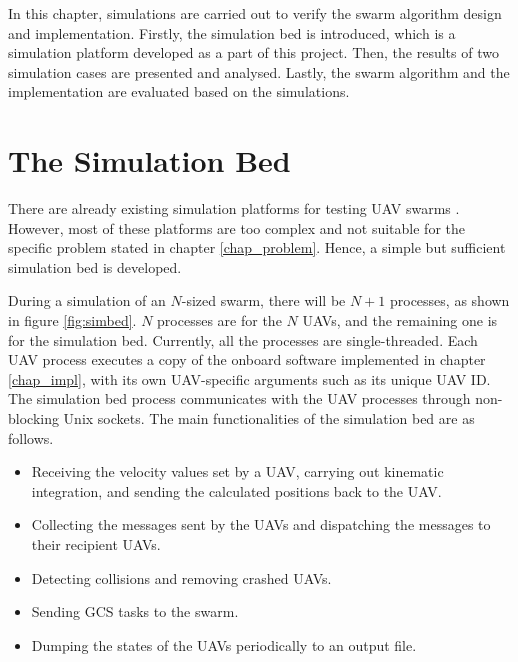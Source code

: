 In this chapter, simulations are carried out to verify the swarm algorithm design and implementation.
Firstly, the simulation bed is introduced,
which is a simulation platform developed as a part of this project.
Then, the results of two simulation cases are presented and analysed.
Lastly, the swarm algorithm and the implementation are evaluated based on the simulations.

\section{The Simulation Bed}

There are already existing simulation platforms for testing UAV swarms \parencite{Chen2023}.
However, most of these platforms are too complex
and not suitable for the specific problem stated in chapter \ref{chap_problem}.
Hence, a simple but sufficient simulation bed is developed.

During a simulation of an $N$-sized swarm,
there will be $N+1$ processes, as shown in figure \ref{fig:simbed}.
$N$ processes are for the $N$ UAVs, and the remaining one is for the simulation bed.
Currently, all the processes are single-threaded.
Each UAV process executes a copy of the onboard software implemented in chapter \ref{chap_impl},
with its own UAV-specific arguments such as its unique UAV ID.
The simulation bed process communicates with the UAV processes through non-blocking Unix sockets.
The main functionalities of the simulation bed are as follows.
\begin{itemize}
    \item Receiving the velocity values set by a UAV, carrying out kinematic integration,
          and sending the calculated positions back to the UAV.
    \item Collecting the messages sent by the UAVs
          and dispatching the messages to their recipient UAVs.
    \item Detecting collisions and removing crashed UAVs.
    \item Sending GCS tasks to the swarm.
    \item Dumping the states of the UAVs periodically to an output file.
\end{itemize}

